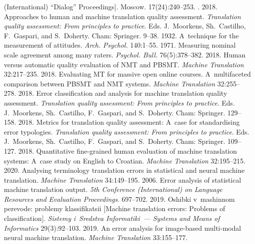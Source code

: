 \begin{multicols}{2}
{{\begin{thebibliography}{99}
(International) ``Dialog'' Proceedings]. Moscow. 17(24):240--253.
.
 2018. Approaches to human and machine 
translation quality assessment. \textit{Translation quality assessment: From principles to practice}. Eds. 
J.~Moorkens, Sh.~Castilho, F.~Gaspari, and S.~Doherty. Cham: Springer. 9--38.
 1932. A~technique for the measurement of attitudes. \textit{Arch. Psychol.} 140:1--55.
 1971. Measuring nominal scale agreement among many raters. \textit{Psychol. Bull.} 
76(5):378--382.
 2018. Human versus automatic quality evaluation of 
NMT and PBSMT. \textit{Machine Translation} 32:217--235.
 2018. Evaluating MT for massive open online 
courses. A~multifaceted comparison between PBSMT and NMT systems. \textit{Machine Translation} 32:255--278.
 2018. Error classification and analysis for machine translation quality assessment. 
\textit{Translation quality assessment: From principles to practice}. 
Eds. J.~Moorkens, Sh.~Castilho, F.~Gaspari, 
and S.~Doherty. Cham: Springer. 129--158.
 2018. Metrics for translation quality assessment: A~case for standardising error 
typologies. \textit{Translation quality assessment: From principles to practice}. Eds. J.~Moorkens, 
Sh.~Castilho, 
F.~Gaspari, and S.~Doherty. Cham: Springer. 109--127.
 2018. Quantitative fine-grained human 
evaluation of machine translation systems: A~case study on English to Croatian. 
\textit{Machine Translation} 32:195--215.
 2020. Analysing terminology translation errors in 
statistical and neural machine translation. \textit{Machine Translation} 34:149--195.
 2006. Error analysis of statistical machine translation 
output. \textit{5th Conference (International) on Language Resources and Evaluation Proceedings}. 697--702. 
 2019. Oshibki v~mashinnom perevode: 
problemy klassifikatsii [Machine translation errors: Problems of classification]. 
\textit{Sistemy i~Sredstva  Informatiki~--- Systems and Means of Informatics} 29(3):92--103.
 2019. An error analysis for image-based multi-modal neural machine 
translation. \textit{Machine Translation} 33:155--177.
\end{thebibliography}

 }
 }

\end{multicols}

